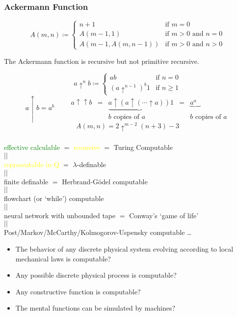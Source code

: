 \documentclass[UTF8,11pt,colorlinks,compress,openany]{beamer}%
\begin{document}
\begin{frame}\frametitle{Ackermann Function}
	\begin{definition}
		\[A(m,n)\coloneqq 
		\begin{cases}
		n+1&\mbox{if }m=0\\
		A(m-1,1)&{\mbox{if }}m>0{\mbox{ and }}n=0\\
		A(m-1,A(m,n-1))&{\mbox{if }}m>0{\mbox{ and }}n>0
		\end{cases}\]
	\end{definition}
	\begin{theorem}
		The Ackermann function is recursive but not primitive recursive.
	\end{theorem}
	\vspace{-1ex}
	\[a\uparrow^nb\coloneqq 
	\begin{cases}
	ab&{\mbox{if }}n=0\\
	(a\uparrow^{n-1})^b1&{\mbox{if }}n\geq 1
	\end{cases}\]
	\[a\uparrow b=a^b\qquad
	\begin{matrix}
	a\uparrow \uparrow b&=&\underbrace{a\uparrow(a\uparrow (\cdots \uparrow a))}1&=& \underbrace{a^{a^{{}^{.\,^{.\,^{.\,^{a}}}}}}}\\&&b{\mbox{ copies of }}a&&b{\mbox{ copies of }}a
	\end{matrix}\]
	\[A(m,n)=2\uparrow^{m-2}(n+3)-3\]
\end{frame}

\begin{frame}\frametitle{}
	\begin{thesis}
		\begin{center}
			\textcolor{green}{effective calculable} $=$ \textcolor{yellow}{recursive} $=$ Turing Computable\\
			$\scriptstyle ||$\\
			\textcolor{yellow}{representable in $\mathrm{Q}$} $=$ $\lambda$-definable\\
			$\scriptstyle ||$\\
			finite definable $=$ Herbrand-G\"odel computable\\
			$\scriptstyle ||$\\
			flowchart (or `while') computable\\
			$\scriptstyle ||$\\
			neural network with unbounded tape $=$ Conway's `game of life'\\
			$\scriptstyle ||$\\
			Post/Markov/McCarthy/Kolmogorov-Uspensky computable \ldots
		\end{center}
	\end{thesis}
	\begin{itemize}
		\item The behavior of any discrete physical system evolving according to local mechanical laws is computable?
		\item Any possible discrete physical process is computable?
		\item Any constructive function is computable?
		\item The mental functions can be simulated by machines?
	\end{itemize}
\end{frame}
\end{document}
